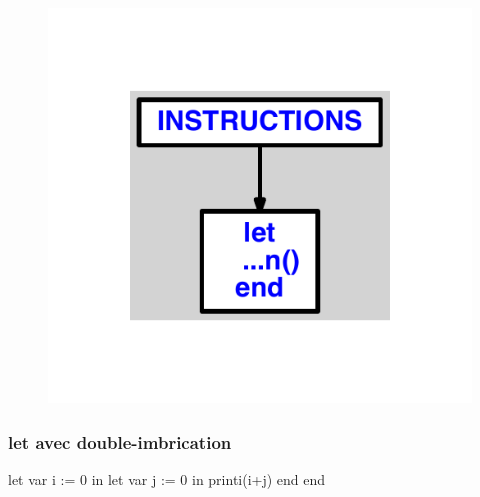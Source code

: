 \documentclass{article}
\begin{document}
\begin{figure}[H]\centering\includegraphics[max width=\textwidth]{ast/ast_269.pdf}\end{figure}\subsubsection{let avec double-imbrication}
\begin{verbatimtab}
let
	var i := 0
in
	let
		var j := 0
	in
		printi(i+j)
	end
end
\end{verbatimtab}
\end{document}
